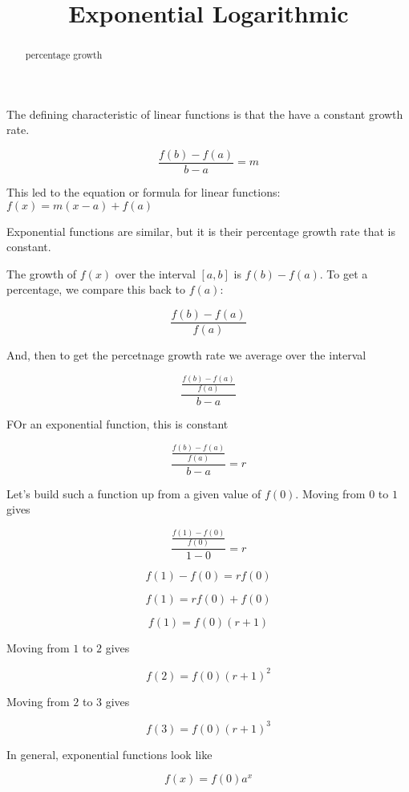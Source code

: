 \documentclass{ximera}
\title{Exponential Logarithmic}
\begin{document}
\begin{abstract}
percentage growth
\end{abstract}
\maketitle




The defining characteristic of linear functions is that the have a constant growth rate.


\[   \frac{f(b)-f(a)}{b-a} = m       \]

This led to the equation or formula for linear functions:  $f(x) = m(x-a) + f(a)$





Exponential functions are similar, but it is their percentage growth rate that is constant.  

The growth of $f(x)$ over the interval $[a, b]$ is $f(b)-f(a)$. To get a percentage, we compare this back to $f(a)$: 

\[      \frac{f(b)-f(a)}{f(a)}    \]

And, then to get the percetnage growth rate we average over the interval



\[      \frac{\frac{f(b)-f(a)}{f(a)}}{b-a}    \]



FOr an exponential function, this is constant


\[      \frac{\frac{f(b)-f(a)}{f(a)}}{b-a}  = r  \]





Let's build such a function up from a given value of $f(0)$. Moving from $0$ to $1$ gives

\[      \frac{\frac{f(1)-f(0)}{f(0)}}{1-0}  = r  \]


\[      f(1)-f(0) = r f(0)  \]


\[      f(1) = r f(0) + f(0)  \]

\[      f(1) =  f(0) (r + 1)  \]



Moving from $1$ to $2$ gives

\[      f(2) =  f(0) (r + 1)^2  \]


Moving from $2$ to $3$ gives

\[      f(3) =  f(0) (r + 1)^3  \]


In general, exponential functions look like


\[      f(x) = f(0) a^x   \]
\end{document}
